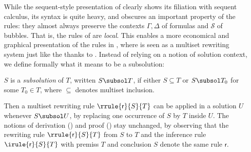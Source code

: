 While the sequent-style presentation of  clearly shows its filiation
with sequent calculus, its syntax is quite heavy, and obscures an important
property of the rules: they almost always preserve the contexts $\Gamma, \Delta$
of formulas and $\mathcal{S}$ of bubbles. That is, the rules of  are
\emph{local}. This enables a more economical and graphical presentation of the
rules in , where  is seen as a multiset rewriting
system just like the {\cham} thanks to . Instead of relying on
a notion of solution context, we define formally what it means to be a
subsolution:

\begin{definition}[Subsolution]
  $S$ is a \emph{subsolution} of $T$, written $S \subsol T$, if either $S
  \subseteq T$ or $S \subsol T_0$ for some $T_0 \in T$, where $\subseteq$
  denotes multiset inclusion. 
\end{definition}

Then a multiset rewriting rule $\rrule{\mathsf{r}}{S}{T}$ can be applied in a
solution $U$ whenever $S \subsol U$, by replacing one occurrence of $S$ by $T$
inside $U$. The notions of derivation () and proof
() stay unchanged, by observing that the rewriting rule
$\rrule{\mathsf{r}}{S}{T}$ from $S$ to $T$ and the inference rule
$\irule{\mathsf{r}}{S}{T}$ with premiss $T$ and conclusion $S$ denote the same
rule $\mathsf{r}$.



